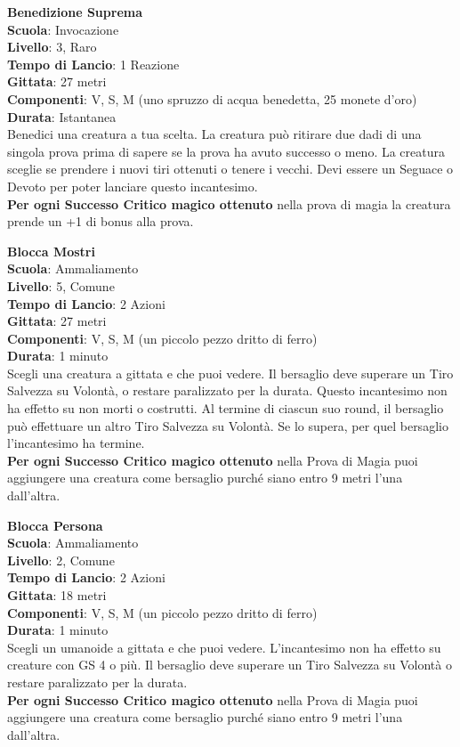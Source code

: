 \begin{multicols}{2}
\medskip\textbf{Benedizione Suprema}\\
\textbf{Scuola}: Invocazione\\
\textbf{Livello}: 3, Raro\\
\textbf{Tempo di Lancio}: 1 Reazione\\
\textbf{Gittata}: 27 metri\\
\textbf{Componenti}: V, S, M (uno spruzzo di acqua benedetta, 25 monete d'oro)\\
\textbf{Durata}: Istantanea\\
Benedici una creatura a tua scelta. La creatura può ritirare due dadi di una singola prova prima di sapere se la prova ha avuto successo o meno. La creatura sceglie se prendere i nuovi tiri ottenuti o tenere i vecchi. Devi essere un Seguace o Devoto per poter lanciare questo incantesimo.\\
\textbf{Per ogni Successo Critico magico ottenuto} nella prova  di magia la creatura prende un +1 di bonus alla prova.

\medskip\textbf{Blocca Mostri}\\
\textbf{Scuola}: Ammaliamento\\
\textbf{Livello}: 5, Comune\\
\textbf{Tempo di Lancio}: 2 Azioni\\
\textbf{Gittata}: 27 metri\\
\textbf{Componenti}: V, S, M (un piccolo pezzo dritto di ferro)\\
\textbf{Durata}: 1 minuto\\
Scegli una creatura a gittata e che puoi vedere. Il bersaglio deve superare un Tiro Salvezza su Volontà, o restare paralizzato per la durata. Questo incantesimo non ha effetto su non morti o costrutti. Al termine di ciascun suo round, il bersaglio può effettuare un altro Tiro Salvezza su Volontà. Se lo supera, per quel bersaglio l'incantesimo ha termine.\\
\textbf{Per ogni Successo Critico magico ottenuto} nella Prova di Magia puoi aggiungere una creatura come bersaglio purché siano entro 9 metri l'una dall'altra.

\medskip\textbf{Blocca Persona}\\
\textbf{Scuola}: Ammaliamento\\
\textbf{Livello}: 2, Comune\\
\textbf{Tempo di Lancio}: 2 Azioni\\
\textbf{Gittata}: 18 metri\\
\textbf{Componenti}: V, S, M (un piccolo pezzo dritto di ferro)\\
\textbf{Durata}: 1 minuto\\
Scegli un umanoide a gittata e che puoi vedere. L'incantesimo non ha effetto su creature con GS 4 o più. Il bersaglio deve superare un Tiro Salvezza su Volontà o restare paralizzato per la durata.\\
\textbf{Per ogni Successo Critico magico ottenuto} nella Prova di Magia puoi aggiungere una creatura come bersaglio purché siano entro 9 metri l'una dall'altra.


\end{multicols}
